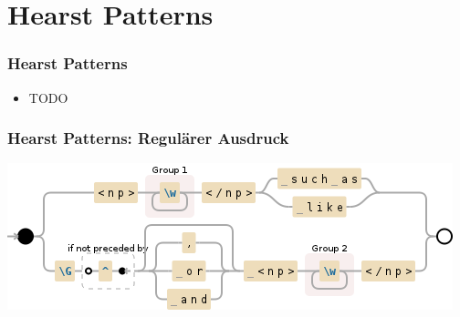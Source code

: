 
\section{Hearst Patterns}
\label{sec:hearst-patterns}

\begin{frame}
  \frametitle{Hearst Patterns}

  \begin{itemize}
  \item TODO
  \end{itemize}
\end{frame}

\begin{frame}
  \frametitle{Hearst Patterns: Regulärer Ausdruck}

  \includegraphics[scale=0.63]{img/regex}
\end{frame}